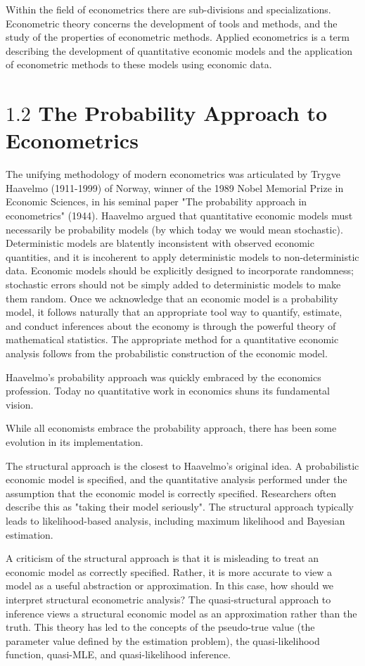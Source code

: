 \documentclass[10pt]{article}
\begin{document}
Within the field of econometrics there are sub-divisions and specializations. Econometric theory concerns the development of tools and methods, and the study of the properties of econometric methods. Applied econometrics is a term describing the development of quantitative economic models and the application of econometric methods to these models using economic data.

\section{$1.2$ The Probability Approach to Econometrics}
The unifying methodology of modern econometrics was articulated by Trygve Haavelmo (1911-1999) of Norway, winner of the 1989 Nobel Memorial Prize in Economic Sciences, in his seminal paper "The probability approach in econometrics" (1944). Haavelmo argued that quantitative economic models must necessarily be probability models (by which today we would mean stochastic). Deterministic models are blatently inconsistent with observed economic quantities, and it is incoherent to apply deterministic models to non-deterministic data. Economic models should be explicitly designed to incorporate randomness; stochastic errors should not be simply added to deterministic models to make them random. Once we acknowledge that an economic model is a probability model, it follows naturally that an appropriate tool way to quantify, estimate, and conduct inferences about the economy is through the powerful theory of mathematical statistics. The appropriate method for a quantitative economic analysis follows from the probabilistic construction of the economic model.

Haavelmo's probability approach was quickly embraced by the economics profession. Today no quantitative work in economics shuns its fundamental vision.

While all economists embrace the probability approach, there has been some evolution in its implementation.

The structural approach is the closest to Haavelmo's original idea. A probabilistic economic model is specified, and the quantitative analysis performed under the assumption that the economic model is correctly specified. Researchers often describe this as "taking their model seriously". The structural approach typically leads to likelihood-based analysis, including maximum likelihood and Bayesian estimation.

A criticism of the structural approach is that it is misleading to treat an economic model as correctly specified. Rather, it is more accurate to view a model as a useful abstraction or approximation. In this case, how should we interpret structural econometric analysis? The quasi-structural approach to inference views a structural economic model as an approximation rather than the truth. This theory has led to the concepts of the pseudo-true value (the parameter value defined by the estimation problem), the quasi-likelihood function, quasi-MLE, and quasi-likelihood inference.
\end{document}
